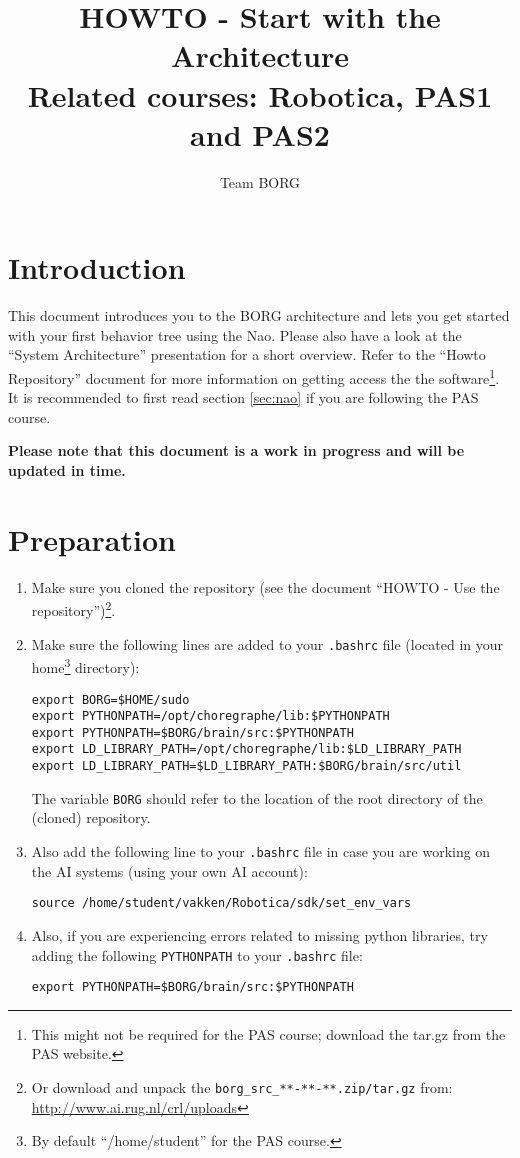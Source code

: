 \documentclass[a4paper, 10pt]{article}
\title{HOWTO - Start with the Architecture \\ \small{Related courses: Robotica, PAS1 and PAS2}}
\author{Team BORG}
\begin{document}
\maketitle

\tableofcontents

\section{Introduction}

This document introduces you to the BORG architecture and lets you get started with your first behavior tree using the Nao.
Please also have a look at the ``System Architecture'' presentation for a short overview.
Refer to the ``Howto Repository'' document for more information on getting access the the software\footnote{This might not be required for the PAS course; download the tar.gz from the PAS website.}.
It is recommended to first read section \ref{sec:nao} if you are following the PAS course.

\textbf{Please note that this document is a work in progress and will be updated in time.}

\section{Preparation}
\label{sec:preparation}

\begin{enumerate}
    \item Make sure you cloned the repository (see the document ``HOWTO - Use the repository'')\footnote{Or download and unpack the \lstinline{borg_src_**-**-**.zip/tar.gz} from: \url{http://www.ai.rug.nl/crl/uploads}}. 
    \item Make sure the following lines are added to your \lstinline{.bashrc} file (located in your home\footnote{By default ``/home/student'' for the PAS course.} directory):
\begin{lstlisting}
export BORG=$HOME/sudo
export PYTHONPATH=/opt/choregraphe/lib:$PYTHONPATH
export PYTHONPATH=$BORG/brain/src:$PYTHONPATH
export LD_LIBRARY_PATH=/opt/choregraphe/lib:$LD_LIBRARY_PATH
export LD_LIBRARY_PATH=$LD_LIBRARY_PATH:$BORG/brain/src/util
\end{lstlisting}
    The variable \lstinline{BORG} should refer to the location of the root directory of the (cloned) repository.
    \item Also add the following line to your \lstinline{.bashrc} file in case you are working on the AI systems (using your own AI account):
\begin{lstlisting}
source /home/student/vakken/Robotica/sdk/set_env_vars
\end{lstlisting}
    \item Also, if you are experiencing errors related to missing python libraries, try adding the following \lstinline{PYTHONPATH} to your \lstinline{.bashrc} file:
\begin{lstlisting}
export PYTHONPATH=$BORG/brain/src:$PYTHONPATH
\end{lstlisting}
\end{enumerate}
\end{document}
